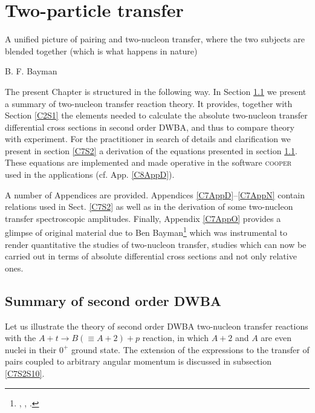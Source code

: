 
 \chapter{Two-particle transfer}\label{C7}
  \epigraph{A unified picture of pairing and two-nucleon transfer, where the two subjects are blended together (which is what happens in nature) }{B. F.  Bayman}



 



The present Chapter is structured in the following way. In Section \ref{C7S1} we present a summary of two-nucleon transfer reaction theory. It provides, together with Section \ref{C2S1} the elements needed to calculate the absolute two-nucleon transfer differential cross sections in second order DWBA, and thus to compare theory with experiment.
For the practitioner in search of details and clarification we present in section \ref{C7S2}  a  derivation of the equations presented in section \ref{C7S1}. These equations are implemented and made operative  in the software \textsc{cooper}  used in the applications (cf. App. \ref{C8AppD}).

A number of Appendices are provided.   Appendices \ref{C7AppD}--\ref{C7AppN} contain relations used in Sect. \ref{C7S2} as well as in the derivation of some two-nucleon transfer spectroscopic amplitudes. Finally, Appendix \ref{C7AppO} provides a glimpse of original material due to Ben Bayman\footnote{\cite{Bayman:70}, \cite{Bayman:71}, \cite{Bayman:82}.} which was instrumental to render quantitative the studies of two-nucleon transfer, studies which can now be carried out in terms of absolute differential cross sections and not only relative ones.
\section{Summary of second order DWBA}\label{C7S1}
Let us illustrate the  theory of second order DWBA two-nucleon transfer reactions  with the  $A+t \rightarrow B(\equiv A+2)+p$ reaction, in which $A+2$ and $A$ are even nuclei in their $0^+$ ground state. The extension of the  expressions to the transfer of pairs coupled to arbitrary angular momentum is discussed in subsection \ref{C7S2S10}. 


